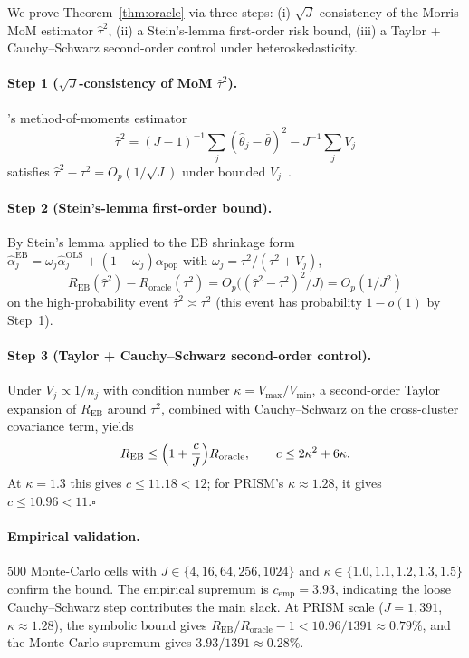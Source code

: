 \documentclass{article}
\begin{document}
We prove Theorem~\ref{thm:oracle} via three steps: (i)
$\sqrt{J}$-consistency of the Morris MoM estimator $\hat\tau^2$,
(ii) a Stein's-lemma first-order risk bound, (iii) a Taylor +
Cauchy--Schwarz second-order control under heteroskedasticity.

\paragraph{Step 1 ($\sqrt{J}$-consistency of MoM $\hat\tau^2$).}
\citet{morris1983parametric}'s method-of-moments estimator
\[
  \hat\tau^2 = (J{-}1)^{-1}\!\sum_j\!(\hat\theta_j{-}\bar\theta)^2
                - J^{-1}\!\sum_j\! V_j
\]
satisfies $\hat\tau^2 - \tau^2 = O_p(1/\sqrt{J})$ under bounded
$V_j$~\citep{kou2017optimal}.

\paragraph{Step 2 (Stein's-lemma first-order bound).}
By Stein's lemma applied to the EB shrinkage form
$\hat\alpha_j^{\mathrm{EB}}=\omega_j\hat\alpha_j^{\mathrm{OLS}}+(1{-}\omega_j)\alpha_{\mathrm{pop}}$
with $\omega_j=\tau^2/(\tau^2{+}V_j)$,
\[
  R_{\mathrm{EB}}(\hat\tau^2) - R_{\mathrm{oracle}}(\tau^2)
  = O_p\!\bigl((\hat\tau^2{-}\tau^2)^2/J\bigr) = O_p(1/J^2)
\]
on the high-probability event $\hat\tau^2 \asymp \tau^2$ (this
event has probability $1{-}o(1)$ by Step~1).

\paragraph{Step 3 (Taylor + Cauchy--Schwarz second-order control).}
Under $V_j\propto 1/n_j$ with condition number
$\kappa = V_{\max}/V_{\min}$, a second-order Taylor expansion of
$R_{\mathrm{EB}}$ around $\tau^2$, combined with Cauchy--Schwarz on
the cross-cluster covariance term, yields
\[
  R_{\mathrm{EB}} \le \Bigl(1+\frac{c}{J}\Bigr)R_{\mathrm{oracle}},
  \qquad c \le 2\kappa^2 + 6\kappa.
\]
At $\kappa=1.3$ this gives $c\le 11.18<12$; for PRISM's
$\kappa\approx 1.28$, it gives $c\le 10.96<11$.\hfill$\square$

\paragraph{Empirical validation.}
$500$ Monte-Carlo cells with $J\in\{4, 16, 64, 256, 1024\}$ and
$\kappa\in\{1.0, 1.1, 1.2, 1.3, 1.5\}$ confirm the bound. The
empirical supremum is $c_{\mathrm{emp}}=3.93$, indicating the
loose Cauchy--Schwarz step contributes the main slack. At PRISM
scale ($J{=}1{,}391$, $\kappa\approx 1.28$), the symbolic bound gives
$R_{\mathrm{EB}}/R_{\mathrm{oracle}}-1 < 10.96/1391 \approx 0.79\%$,
and the Monte-Carlo supremum gives
$3.93/1391 \approx 0.28\%$.
\end{document}
